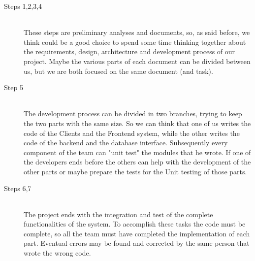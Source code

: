 \begin{description}
	\item[Steps 1,2,3,4] \hfill \\
	These steps are preliminary analyses and documents, so, as said before, we think could be a good choice
	to spend some time thinking together about the requirements, design, architecture and development process
	of our project. Maybe the various parts of each document can be divided between us, but we are both focused
	on the same document (and task).
	\item[Step 5] \hfill \\
	The development process can be divided in two branches, trying to keep the two parts with the same size.
	So we can think that one of us writes the code of the Clients and the Frontend system, while the other writes
	the code of the backend and the database interface. Subsequently every component of the team can "unit test"
	the modules that he wrote. If one of the developers ends before the others can help with the development of
	the other parts or maybe prepare the tests for the Unit testing of those parts.
	\item[Steps 6,7] \hfill \\
	The project ends with the integration and test of the complete functionalities of the system. To accomplish
	these tasks the code must be complete, so all the team must have completed the implementation of each part.
	Eventual errors may be found and corrected by the same person that wrote the wrong code.
\end{description}